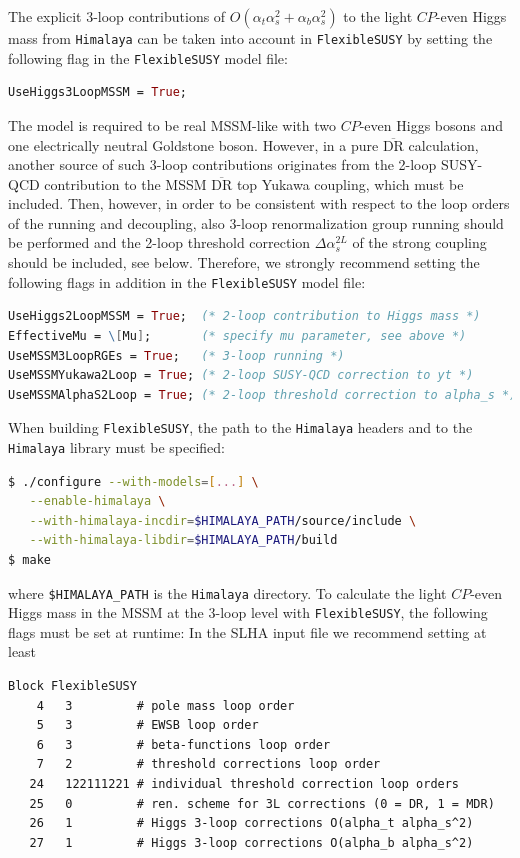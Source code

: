 \documentclass[final,3p,11pt,pdflatex]{elsarticle}
\makeatletter
\newcommand{\fs}{\texttt{FlexibleSUSY}\@\xspace}
\newcommand{\Himalaya}{\texttt{Himalaya}\@\xspace}
\newcommand{\code}[1]{\lstinline|#1|}  %
\newcommand{\ol}[1]{\overline{#1}}
\newcommand{\DRbar}{\ensuremath{\ol{\text{DR}}}\xspace}
\newcommand{\CP}{\ensuremath{CP}\xspace}
\newcommand{\SQCD}{SUSY-QCD\xspace}
\def\at{\alpha_t}
\def\ab{\alpha_b}
\def\as{\alpha_s}
\makeatother
\begin{document}
The explicit 3-loop contributions of $O(\at\as^2 + \ab\as^2)$ to the
light \CP-even Higgs mass from \Himalaya can be taken into account in
\fs by setting the following flag in the \fs model file:
%
\begin{lstlisting}[language=Mathematica]
UseHiggs3LoopMSSM = True;
\end{lstlisting}
%
The model is required to be real MSSM-like with two \CP-even Higgs bosons and
one electrically neutral Goldstone boson.
%
However, in a pure \DRbar calculation, another source of such 3-loop
contributions originates from the 2-loop \SQCD contribution to the MSSM
\DRbar top Yukawa coupling, which must be included.  Then, however, in
order to be consistent with respect to the loop orders of the running and
decoupling, also 3-loop renormalization group running should be
performed and the 2-loop threshold correction $\Delta\as^{2L}$ of
the strong coupling should be included, see below.  Therefore, we
strongly recommend setting the following flags in addition in the \fs
model file:
%
\begin{lstlisting}[language=Mathematica]
UseHiggs2LoopMSSM = True;  (* 2-loop contribution to Higgs mass *)
EffectiveMu = \[Mu];       (* specify mu parameter, see above *)
UseMSSM3LoopRGEs = True;   (* 3-loop running *)
UseMSSMYukawa2Loop = True; (* 2-loop SUSY-QCD correction to yt *)
UseMSSMAlphaS2Loop = True; (* 2-loop threshold correction to alpha_s *)
\end{lstlisting}
%
When building \fs, the path to the \Himalaya headers and to the
\Himalaya library must be specified:
%
\begin{lstlisting}[language=bash]
$ ./configure --with-models=[...] \
   --enable-himalaya \
   --with-himalaya-incdir=$HIMALAYA_PATH/source/include \
   --with-himalaya-libdir=$HIMALAYA_PATH/build
$ make
\end{lstlisting}
%
where \code{$HIMALAYA_PATH} is the \Himalaya directory. %
To calculate the light \CP-even Higgs mass in the MSSM at the 3-loop
level with \fs, the following flags must be set at runtime: In the
SLHA input file we recommend setting at least
%
\begin{lstlisting}
Block FlexibleSUSY
    4   3         # pole mass loop order
    5   3         # EWSB loop order
    6   3         # beta-functions loop order
    7   2         # threshold corrections loop order
   24   122111221 # individual threshold correction loop orders
   25   0         # ren. scheme for 3L corrections (0 = DR, 1 = MDR)
   26   1         # Higgs 3-loop corrections O(alpha_t alpha_s^2)
   27   1         # Higgs 3-loop corrections O(alpha_b alpha_s^2)
\end{lstlisting}
\end{document}

